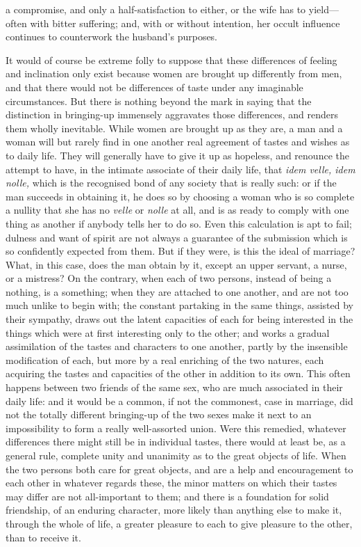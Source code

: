 \documentclass[12pt]{report}
\begin{document}
a compromise, and only a half-satisfaction to either, or the wife has to yield—often with bitter suffering; and, with or without intention, her occult influence continues to counterwork the husband's purposes.

It would of course be extreme folly to suppose that these differences of feeling and inclination only exist because women are brought up differently from men, and that there would not be differences of taste under any imaginable circumstances. But there is nothing beyond the mark in saying that the distinction in bringing-up immensely aggravates those differences, and renders them wholly inevitable. While women are brought up as they are, a man and a woman will but rarely find in one another real agreement of tastes and wishes as to daily life. They will generally have to give it up as hopeless, and renounce the attempt to have, in the intimate associate of their daily life, that \emph{idem velle, idem nolle,} which is the recognised bond of any society that is really such: or if the man succeeds in obtaining it, he does so by choosing a woman who is so complete a nullity that she has no \emph{velle} or \emph{nolle} at all, and is as ready to comply with one thing as another if anybody tells her to do so. Even this calculation is apt to fail; dulness and want of spirit are not always a guarantee of the submission which is so confidently expected from them. But if they were, is this the ideal of marriage? What, in this case, does the man obtain by it, except an upper servant, a nurse, or a mistress? On the contrary, when each of two persons, instead of being a nothing, is a something; when they are attached to one another, and are not too much unlike to begin with; the constant partaking in the same things, assisted by their sympathy, draws out the latent capacities of each for being interested in the things which were at first interesting only to the other; and works a gradual assimilation of the tastes and characters to one another, partly by the insensible modification of each, but more by a real enriching of the two natures, each acquiring the tastes and capacities of the other in addition to its own. This often happens between two friends of the same sex, who are much associated in their daily life: and it would be a common, if not the commonest, case in marriage, did not the totally different bringing-up of the two sexes make it next to an impossibility to form a really well-assorted union. Were this remedied, whatever differences there might still be in individual tastes, there would at least be, as a general rule, complete unity and unanimity as to the great objects of life. When the two persons both care for great objects, and are a help and encouragement to each other in whatever regards these, the minor matters on which their tastes may differ are not all-important to them; and there is a foundation for solid friendship, of an enduring character, more likely than anything else to make it, through the whole of life, a greater pleasure to each to give pleasure to the other, than to receive it.
\end{document}
